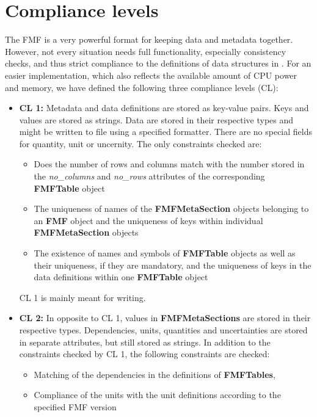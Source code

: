 \documentclass[10pt,utf8, mainlanguage=english]{ufcd-info}
\newcommand{\fmfobj}[1]{{\textbf{\textsf{#1}}}}
\begin{document}
\section{Compliance levels}
\label{sec:cls}

The FMF is a very powerful format for keeping data and metadata together. However, not every situation needs full functionality, especially consistency checks, and thus strict compliance to the definitions of data structures in \cite{RiedeCPC181_2010}. For an easier implementation, which also reflects the available amount of CPU power and memory, we have defined the following three compliance levels (CL):

\begin{itemize}
	\item {\bf CL 1:} Metadata and data definitions are stored as key-value pairs. Keys and values are stored as strings. Data are stored in their respective types and might be written to file using a specified formatter. There are no special fields for quantity, unit or uncernity. The only constraints checked are:
	\begin{itemize}
		\item Does the number of rows and columns match with the number stored in the {\sl no\_columns} and {\sl no\_rows} attributes of the corresponding \fmfobj{FMFTable} object
		\item The uniqueness of names of the \fmfobj{FMFMetaSection} objects belonging to  an \fmfobj{FMF} object and the uniqueness of keys within individual \fmfobj{FMFMetaSection} objects
		\item The existence of names and symbols of \fmfobj{FMFTable} objects as well as their uniqueness, if they are mandatory, and the uniqueness of keys in the data definitions within one \fmfobj{FMFTable} object
	\end{itemize}
	CL 1 is mainly meant for writing.
	\item {\bf CL 2:} In opposite to CL 1, values in \fmfobj{FMFMetaSections} are stored in their respective types. Dependencies, units, quantities and uncertainties are stored in separate attributes, but still stored as strings.
	In addition to the constraints checked by CL 1, the following constraints are checked:
		\begin{itemize}
		\item Matching of the dependencies in the definitions of \fmfobj{FMFTables},
		\item Compliance of the units with the unit definitions according to the specified FMF version

\end{itemize}
\end{itemize}
\end{document}
